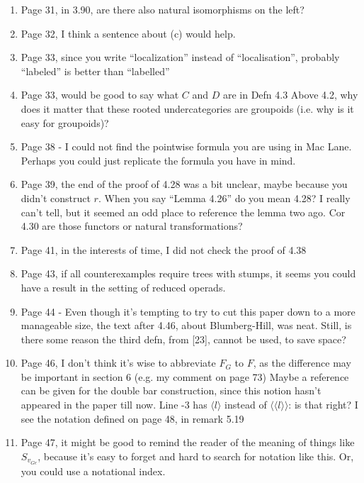 \documentclass{article}
\begin{document}
\begin{enumerate}
\item
Page 31, in 3.90, are there also natural isomorphisms on the left?

\item
Page 32, I think a sentence about (c) would help.

\item
Page 33, since you write ``localization'' instead of ``localisation'', probably ``labeled'' is better than ``labelled''

\item
Page 33, would be good to say what $C$ and $D$ are in Defn 4.3
Above 4.2, why does it matter that these rooted undercategories are groupoids (i.e. why is it easy for groupoids)?

\item
Page 38 - I could not find the pointwise formula you are using in Mac Lane. Perhaps you could just replicate the formula you have in mind.

\item
Page 39, the end of the proof of 4.28 was a bit unclear, maybe because you didn't construct $r$.
When you say ``Lemma 4.26'' do you mean 4.28? I really can't tell, but it seemed an odd place to reference the lemma two ago.
Cor 4.30 are those functors or natural transformations?

\item
Page 41, in the interests of time, I did not check the proof of 4.38

\item
Page 43, if all counterexamples require trees with stumps, it seems you could have a result in the setting of reduced operads.

\item
Page 44 - Even though it's tempting to try to cut this paper down to a more manageable size, the text after 4.46, about Blumberg-Hill, was neat. Still, is there some reason the third defn, from [23], cannot be used, to save space?

\item
Page 46, I don't think it's wise to abbreviate $F_G$ to $F$, as the difference may be important in section 6 (e.g. my comment on page 73)
Maybe a reference can be given for the double bar construction, since this notion hasn't appeared in the paper till now.
Line -3 has $\langle l \rangle$ instead of 
$\langle \langle l \rangle \rangle$: is that right? I see the notation defined on page 48, in remark 5.19

\item
Page 47, it might be good to remind the reader of the meaning of things like $S_{v_{G e}}$, because it's easy to forget and hard to search for notation like this. Or, you could use a notational index.


\end{enumerate}
\end{document}
